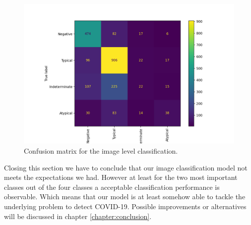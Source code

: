 \begin{figure}
	\centering
	\includegraphics[width=.7\linewidth]{img/confusion_study_58.png}
	\caption{Confusion matrix for the image level classification.}
	\label{fig:study-confusion-matrix}
\end{figure}

Closing this section we have to conclude that our image classification model not meets the expectations we had. However at least for the two most important classes out of the four classes a acceptable classification performance is observable. Which means that our model is at least somehow able to tackle the underlying problem to detect COVID-19. Possible improvements or alternatives will be discussed in chapter \ref{chapter:conclusion}.
